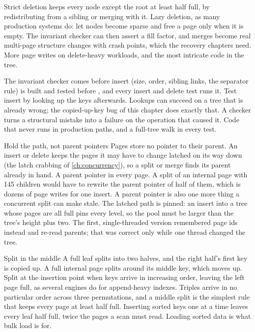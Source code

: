 \begin{decision}{Strict deletion}
  keeps every node except the root at least half
full, by redistributing from a sibling or merging with it.
 Lazy deletion, as many production systems do: let nodes
become sparse and free a page only when it is empty.
 The invariant checker can then assert a fill factor, and merges
become real multi-page structure changes with crash points, which the recovery
chapters need.
 More page writes on delete-heavy workloads, and the most intricate
code in the tree.
\end{decision}

\begin{decision}{The invariant checker comes before insert}
  (size, order, sibling links, the
separator rule) is built and tested before , and every insert and
delete test runs it.
 Test insert by looking up the keys afterwards.
 Lookups can succeed on a tree that is already wrong; the
copied-up-key bug of this chapter does exactly that. A checker turns a
structural mistake into a failure on the operation that caused it.
 Code that never runs in production paths, and a full-tree walk in
every test.
\end{decision}

\begin{decision}{Hold the path, not parent pointers}
 Pages store no pointer to their parent. An insert or delete
keeps the pages it may have to change latched on its way down (the latch
crabbing of \cref{ch:concurrency}), so a split or merge finds its parent
already in hand.
 A parent pointer in every page.
 A split of an internal page with 145 children would have to rewrite
the parent pointer of half of them, which is dozens of page writes for one
insert. A parent pointer is also one more thing a concurrent split can make
stale.
 The latched path is pinned: an insert into a tree whose pages are
all full pins every level, so the pool must be larger than the tree's height
plus two. The first, single-threaded version remembered page ids instead and
re-read parents; that was correct only while one thread changed the tree.
\end{decision}

\begin{decision}{Split in the middle}
 A full leaf splits into two halves, and the right half's first
key is copied up. A full internal page splits around its middle key, which
moves up.
 Split at the insertion point when keys arrive in
increasing order, leaving the left page full, as several engines do for
append-heavy indexes.
 Triples arrive in no particular order across three permutations,
and a middle split is the simplest rule that keeps every page at least half
full.
 Inserting sorted keys one at a time leaves every leaf half full,
twice the pages a scan must read. Loading sorted data is what bulk load is for.
\end{decision}

